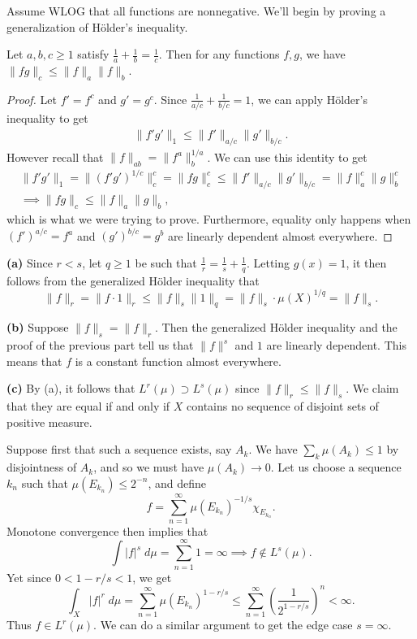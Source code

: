 \documentclass[11pt,letterpaper]{article}
\begin{document}
\begin{solution}
    \quad Assume WLOG that all functions are nonnegative. We'll begin by proving a generalization of H\"older's inequality.
    \begin{claim}
        Let $a,b,c\geq 1$ satisfy $\frac{1}{a}+\frac{1}{b}=\frac{1}{c}$. Then for any functions $f,g$, we have $\|fg\|_c \leq \|f\|_a\|f\|_b$.  
    \end{claim}
    \begin{proof}
        Let $f' = f^c$ and $g'=g^c$. Since $\frac{1}{a /c} + \frac{1}{b /c} = 1$, we can apply H\"older's inequality to get
        \[
            \begin{aligned}
                \|f'g'\|_1 \leq \|f'\|_{a /c}\|g'\|_{b /c}.
            \end{aligned}
        \]
        However recall that $\|f\|_{ab} = \|f^a\|^{1 /a}_b$. We can use this identity to get
        \[
            \begin{aligned}
                \|f'g'\|_1=\|(f'g')^{1 /c}\|_{c}^c = \|fg\|^c_c \leq \|f'\|_{a /c}\|g'\|_{b /c} = \|f\|_{a}^c\|g\|_b^c\\
                \implies \|fg\|_c \leq \|f\|_a\|g\|_b,
            \end{aligned}
        \]
        which is what we were trying to prove. Furthermore, equality only happens when $(f')^{a /c}=f^a$ and $(g')^{b /c}=g^b$ are linearly dependent almost everywhere.
    \end{proof}

    \textbf{(a)} Since $r < s$, let $q\geq 1$ be such that $\frac{1}{r} = \frac{1}{s} + \frac{1}{q}$. Letting $g(x)=1$, it then follows from the generalized H\"older inequality that
    \[
        \|f\|_r = \|f\cdot 1\|_r \leq \|f\|_s\|1\|_q = \|f\|_s \cdot\mu(X)^{1 /q} = \|f\|_s
    .\] 

    \textbf{(b)} Suppose $\|f\|_s = \|f\|_r$. Then the generalized H\"older inequality and the proof of the previous part tell us that $\|f\|^s$ and $1$ are linearly dependent. This means that $f$ is a constant function almost everywhere.

    \textbf{(c)} By (a), it follows that $L^r(\mu) \supset L^s(\mu)$ since $\|f\|_r\leq \|f\|_s$. We claim that they are equal if and only if $X$ contains no sequence of disjoint sets of positive measure.  

    \quad Suppose first that such a sequence exists, say $A_k$. We have $\sum_k \mu(A_k) \leq 1$ by disjointness of $A_k$, and so we must have $\mu(A_k) \to 0$. Let us choose a sequence $k_n$ such that $\mu(E_{k_n})\leq 2^{-n}$, and define
    \[
        f = \sum^\infty_{n=1} \mu(E_{k_n})^{-1 /s} \chi_{E_{k_n}}
    .\]   
    \quad Monotone convergence then implies that
    \[
        \int |f|^s \;d\mu = \sum^\infty_{n=1}1 = \infty \implies f \not\in L^s(\mu)
    .\]
    Yet since $0 < 1-r / s < 1$, we get
    \[
        \int_X |f|^r \;d\mu = \sum^\infty_{n=1}\mu(E_{k_n})^{1-r /s}\leq \sum^\infty_{n=1}\left(\frac{1}{2^{1-r /s}}\right)^n  < \infty
    .\] 
    Thus $f \in L^r(\mu)$. We can do a similar argument to get the edge case $s=\infty$.


\end{solution}
\end{document}
